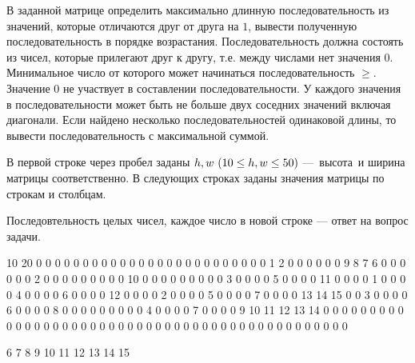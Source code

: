 
В заданной матрице определить максимально длинную последовательность из значений, которые отличаются друг от друга на $1$, вывести полученную последовательность в порядке возрастания. Последовательность должна состоять из чисел, которые прилегают друг к другу, т.е. между числами нет значения $0$. Минимальное число от которого может начинаться последовательность $\geq$. Значение $0$ не участвует в составлении последовательности. У каждого значения в последовательности может быть не больше двух соседних значений включая диагонали. Если найдено несколько последовательностей одинаковой длины, то вывести последовательность с максимальной суммой.


В первой строке через пробел заданы $h, \space w\space (10\leq h, w \leq 50)$ — высота и ширина матрицы соответственно. В следующих строках заданы значения матрицы по строкам и столбцам.

\outputfmtSection

Последовтельность целых чисел, каждое число в новой строке — ответ на вопрос задачи.


\begin{myverbbox}[\small]{\vinput}
    10 20
    0 0 0 0 0 0 0 0 0 0 0 0 0 0 0 0 0 0 0 0
    0 0 0 0 0 1 2 0 0 0 0 0 0 9 8 7 6 0 0 0
    0 0 0 2 0 0 0 0 0 0 0 0 0 10 0 0 0 0 0 0
    0 0 0 3 0 0 0 0 5 0 0 0 0 11 0 0 0 0 1 0
    0 0 0 4 0 0 0 0 6 0 0 0 0 12 0 0 0 0 2 0
    0 0 0 5 0 0 0 0 7 0 0 0 0 13 14 15 0 0 3 0
    0 0 0 6 0 0 0 0 8 0 0 0 0 0 0 0 0 0 4 0
    0 0 0 7 0 0 0 0 9 10 11 12 13 14 0 0 0 0 0 0
    0 0 0 0 0 0 0 0 0 0 0 0 0 0 0 0 0 0 0 0
    0 0 0 0 0 0 0 0 0 0 0 0 0 0 0 0 0 0 0 0
\end{myverbbox}
\begin{myverbbox}[\small]{\voutput}
    6
    7
    8
    9
    10
    11
    12
    13
    14
    15
\end{myverbbox}

